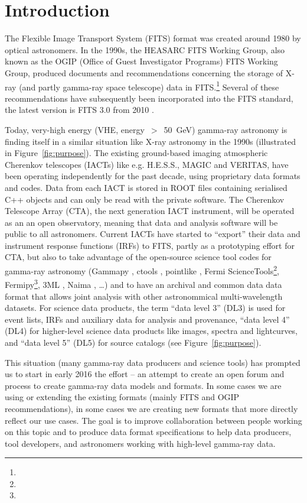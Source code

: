 \section{Introduction}

The Flexible Image Transport System (FITS) format was created around 1980 \cite{Wells:1981} by optical astronomers. In the 1990s, the HEASARC FITS Working Group, also known as the OGIP (Office of Guest Investigator Programs) FITS Working Group, produced documents and recommendations concerning the storage of X-ray (and partly gamma-ray space telescope) data in FITS.\footnote{\ogip} Several of these recommendations have subsequently been incorporated into the FITS standard, the latest version is FITS 3.0 from 2010 \cite{Pence:2010}.

Today, very-high energy (VHE, energy~$>$~50~GeV) gamma-ray astronomy is finding itself in a similar situation like X-ray astronomy in the 1990s (illustrated in Figure~\ref{fig:purpose}). The existing ground-based imaging atmospheric Cherenkov telescopes (IACTs) like e.g. H.E.S.S., MAGIC and VERITAS, have been operating independently for the past decade, using proprietary data formats and codes. Data from each IACT is stored in ROOT files containing serialised C++ objects and can only be read with the private software. The Cherenkov Telescope Array (CTA), the next generation IACT instrument, will be operated as an an open observatory, meaning that data and analysis software will be public to all astronomers. Current IACTs have started to ``export'' their data and instrument response functions (IRFs) to FITS, partly as a prototyping effort for CTA, but also to take advantage of the open-source science tool codes for gamma-ray astronomy (Gammapy \cite{2015arXiv150907408D}, ctools \cite{2016AnA...593A...1K}, pointlike \citep{2010PhDT.......147K}, Fermi ScienceTools\footnote{\fermist}, Fermipy\footnote{\fermipy}, 3ML \citep{2015arXiv150708343V}, Naima \citep{2015arXiv150903319Z}, \ldots) and to have an archival and common data data format that allows joint analysis with other astronommical multi-wavelength datasets.
For science data products, the term ``data level 3'' (DL3) is used for event lists, IRFs and auxiliary data for analysis and provenance, ``data level 4'' (DL4) for higher-level science data products like images, spectra and lightcurves, and ``data level 5'' (DL5) for source catalogs (see Figure~\ref{fig:purpose}).

This situation (many gamma-ray data producers and science tools) has prompted us to start in early 2016 the \gadf effort -- an attempt to create an open forum and process to create gamma-ray data models and formats. In some cases we are using or extending the existing formats (mainly FITS and OGIP recommendations), in some cases we are creating new formats that more directly reflect our use cases. The goal is to improve collaboration between people working on this topic and to produce data format specifications to help data producers, tool developers, and astronomers working with high-level gamma-ray data.

